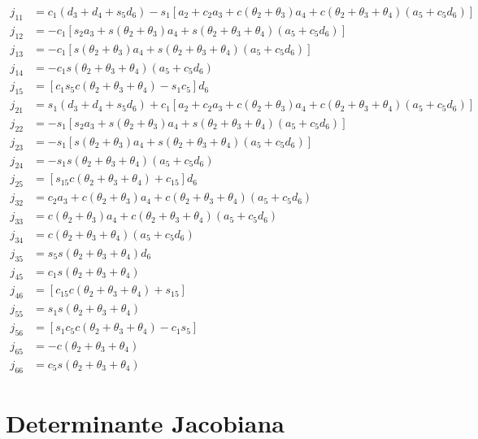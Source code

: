 \begin{align*}
    j_{11} &= c_1(d_3 + d_4 + s_5d_6) - s_1[a_2 + c_2a_3 + c(\theta_2 + \theta_3)a_4 + c(\theta_2+\theta_3+\theta_4)(a_5 + c_5d_6)] \\
    j_{12} &= - c_1[s_2a_3 + s(\theta_2 + \theta_3)a_4 + s(\theta_2+\theta_3+\theta_4)(a_5 + c_5d_6)] \\
    j_{13} &= - c_1[s(\theta_2+\theta_3)a_4 + s(\theta_2+\theta_3+\theta_4)(a_5 + c_5d_6)] \\
    j_{14} &= - c_1s(\theta_2+\theta_3+\theta_4)(a_5 + c_5d_6) \\
    j_{15} &= [c_1s_5c(\theta_2+\theta_3+\theta_4) - s_1c_5]d_6 \\
    j_{21} &= s_1(d_3 + d_4 + s_5d_6) + c_1[a_2 + c_2a_3 + c(\theta_2 + \theta_3)a_4 + c(\theta_2+\theta_3+\theta_4)(a_5 + c_5d_6)] \\
    j_{22} &= - s_1[s_2a_3 + s(\theta_2 + \theta_3)a_4 + s(\theta_2+\theta_3+\theta_4)(a_5 + c_5d_6)] \\
    j_{23} &= - s_1[s(\theta_2+\theta_3)a_4 + s(\theta_2+\theta_3+\theta_4)(a_5 + c_5d_6)] \\
    j_{24} &= - s_1s(\theta_2+\theta_3+\theta_4)(a_5 + c_5d_6) \\
    j_{25} &= [s_{15}c(\theta_2+\theta_3+\theta_4) + c_{15}]d_6 \\
    j_{32} &= c_2a_3 + c(\theta_2 + \theta_3)a_4 + c(\theta_2+\theta_3+\theta_4)(a_5 + c_5d_6) \\
    j_{33} &= c(\theta_2+\theta_3)a_4 + c(\theta_2+\theta_3+\theta_4)(a_5 + c_5d_6) \\
    j_{34} &= c(\theta_2+\theta_3+\theta_4)(a_5 + c_5d_6) \\
    j_{35} &= s_5s(\theta_2+\theta_3+\theta_4)d_6 \\
    j_{45} &= c_1s(\theta_2+\theta_3+\theta_4) \\
    j_{46} &= [c_{15}c(\theta_2+\theta_3+\theta_4) + s_{15}] \\
    j_{55} &= s_1s(\theta_2+\theta_3+\theta_4) \\
    j_{56} &= [s_1c_5c(\theta_2+\theta_3+\theta_4) - c_1s_5] \\
    j_{65} &= -c(\theta_2+\theta_3+\theta_4) \\
    j_{66} &= c_5s(\theta_2+\theta_3+\theta_4)
\end{align*}

\section{Determinante Jacobiana}
\label{AnexoJacobiana-SecDeterminante}

